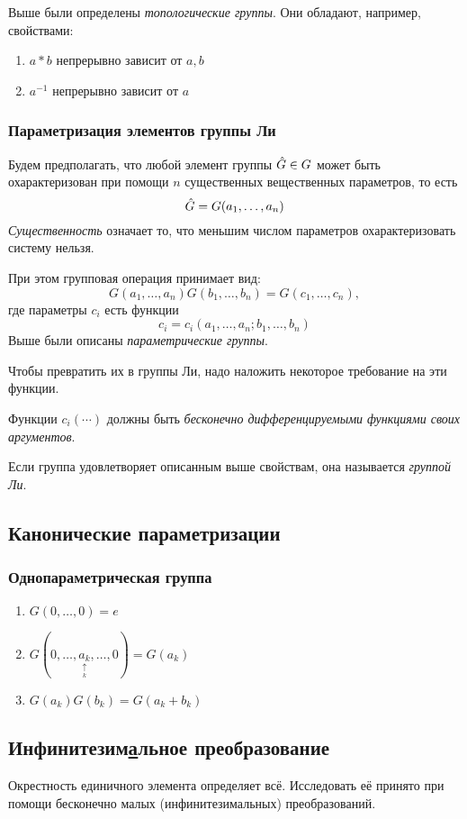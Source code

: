 Выше были определены \emph{топологические группы}. Они обладают, например, свойствами:
\begin{enumerate}
  \item $a \ast b$ непрерывно зависит от $a, b$
  \item $a^{-1}$ непрерывно зависит от $a$
\end{enumerate}

\subsubsection{Параметризация элементов группы Ли}
Будем предполагать, что любой элемент группы $\Hat G \in G$ может быть охарактеризован при помощи $n$ существенных вещественных параметров, то есть
$$
    \Hat G = G(a_1, \ldots, a_n)
$$
\emph{Существенность} означает то, что меньшим числом параметров охарактеризовать систему нельзя.

При этом групповая операция принимает вид:
$$
    G(a_1, \ldots, a_n) G(b_1, \ldots, b_n) = G(c_1, \ldots, c_n),
$$
где параметры $c_i$ есть функции
$$
    c_i = c_i(a_1, \ldots, a_n; b_1, \ldots, b_n)
$$
Выше были описаны \emph{параметрические группы}.

Чтобы превратить их в группы Ли, надо наложить некоторое требование на эти функции.

\Assume Функции $c_i(\cdots)$ должны быть \emph{бесконечно дифференцируемыми функциями своих аргументов}.

\Def Если группа удовлетворяет описанным выше свойствам, она называется \emph{группой Ли}.

\subsection{Канонические параметризации}
\subsubsection{Однопараметрическая группа}
\begin{enumerate}
  \item $G(0, \ldots, 0) = e$
  \item $G(0, \ldots, \underset{\underset{k}{\uparrow}}{a_k}, \ldots, 0) = G(a_k)$
  \item $G(a_k)G(b_k) = G(a_k + b_k)$
\end{enumerate}

\subsection{Инфинитезим\underline{а}льное преобразование}
\def \infzh {{инфинитезимальных}}
\def \infze {{инфинитезимальные }}
\def \infzj {{инфинитезимальный}}
Окрестность единичного элемента определяет всё. Исследовать её принято при помощи бесконечно малых (\infzh) преобразований.

